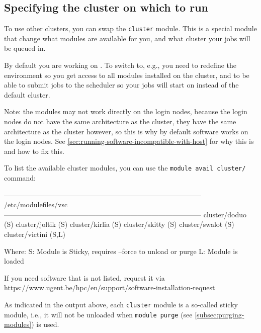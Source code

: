 \fi

\ifgent

\subsection{Specifying the cluster on which to run}
\label{subsec:specifying-the-cluster-on-which-to-run}

To use other clusters, you can swap the \lstinline|cluster| module.
This is a special module that change what modules are available for you,
and what cluster your jobs will be queued in.

By default you are working on . To switch to, e.g., \othercluster you need
to redefine the environment so you get access to all modules installed on
the \othercluster cluster, and to be able to submit jobs to the \othercluster scheduler
so your jobs will start on \othercluster instead of the default  cluster.

\begin{prompt}
\end{prompt}

Note: the \othercluster modules may not work directly on the login nodes, because the
login nodes do not have the same architecture as the \othercluster cluster, they
have the same architecture as the  cluster however, so this is why
by default software works on the login nodes. See \autoref{sec:running-software-incompatible-with-host}
for why this is and how to fix this.

To list the available cluster modules, you can use the \lstinline|module avail cluster/| command:
\begin{prompt}
------------------------------------------------------------------------------------ /etc/modulefiles/vsc ------------------------------------------------------------------------------------
   cluster/doduo (S)    cluster/joltik (S)    cluster/kirlia (S)    cluster/skitty (S)    cluster/swalot (S)    cluster/victini (S,L)

  Where:
   S:  Module is Sticky, requires --force to unload or purge
   L:  Module is loaded

If you need software that is not listed, request it via https://www.ugent.be/hpc/en/support/software-installation-request
\end{prompt}

As indicated in the output above, each \lstinline|cluster| module is a so-called sticky
module, i.e., it will not be unloaded when \lstinline|module purge| (see \autoref{subsec:purging-modules}) is used.

